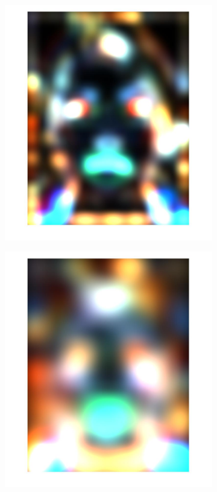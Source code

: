 \documentclass[a4paper]{iacas}
\begin{document}
\begin{figure}[!htbp]
\begin{subfigure}[b]{0.15\textwidth}
		\caption{}
		\label{fig:103}
	\end{subfigure}
	\begin{subfigure}[b]{0.15\textwidth}
		\includegraphics[width=\textwidth]{104.jpg}
		\caption{}
		\label{fig:104}
	\end{subfigure}
	\begin{subfigure}[b]{0.15\textwidth}
		\includegraphics[width=\textwidth]{105.jpg}

\end{subfigure}
\end{figure}
\end{document}
